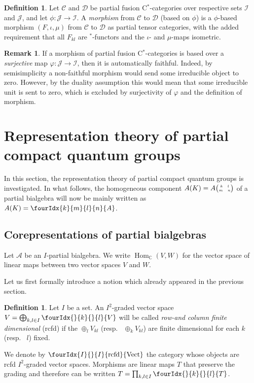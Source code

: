\documentclass[10pt]{article}
\DeclareMathOperator{\Hom}{Hom}
\DeclareMathOperator{\rcf}{\mathrm{rcfd}}
\newcommand{\C}{\mathbb{C}}
\newcommand{\CatCC}{\mathscr{C}}
\newcommand{\CatDD}{\mathscr{D}}
\newcommand{\Vectrcf}{\Gr{\mathrm{Vect}}{I}{I}{}{\rcf}}
\newcommand{\eGr}[5]{#1{{\tiny \begin{pmatrix} #2 \quad #3 \\ #4 \quad #5\end{pmatrix}}}}
\newcommand{\Gr}[5]{\fourIdx{#2}{#4}{#3}{#5}{#1}}%
\newcommand{\Gru}[3]{\Gr{#1}{}{}{#2}{#3}}
\theoremstyle{definition}
\newtheorem{Def}[Theorem]{Definition}
\newtheorem{Rem}[Theorem]{Remark}
\numberwithin{equation}{section}
\begin{document}
\begin{Def} Let $\CatCC$ and $\CatDD$ be partial fusion C$^*$-categories over respective sets $\mathscr{I}$ and $\mathscr{J}$, and let $\phi:\mathscr{J}\rightarrow \mathscr{I}$. 
A \emph{morphism} from $\CatCC$ to $\CatDD$ (based on $\phi$) is a $\phi$-based morphism $(F,\iota,\mu)$ from $\CatCC$ to $\CatDD$ as partial tensor categories, with the added requirement that all $F_{kl}$ are $^*$-functors and the $\iota$- and $\mu$-maps isometric. 
\end{Def} 

\begin{Rem} If a morphism of partial fusion C$^*$-categories is based over a \emph{surjective} map $\varphi: \mathscr{J}\rightarrow \mathscr{I}$, then it is automatically faithful. Indeed, by semisimplicity a non-faithful morphism would send some irreducible object to zero. However, by the duality assumption this would mean that some irreducible unit is sent to zero, which is excluded by surjectivity of $\varphi$ and the definition of morphism.
\end{Rem}


\section{Representation theory of partial compact quantum groups}

In this section, the representation theory of partial compact quantum groups is investigated. In what follows, the homogeneous component $A(K) = \eGr{A}{k}{l}{m}{n}$ of a partial bialgebra will now be mainly written as $A(K) = \Gr{A}{k}{l}{m}{n}$. 

\subsection{Corepresentations of partial bialgebras}


Let $\mathscr{A}$ be an $I$-partial bialgebra. We write
$\Hom_\C(V,W)$ for the vector space of linear maps between two vector
spaces $V$ and $W$.

Let us first formally introduce a notion which already appeared in the previous section.

\begin{Def} Let $I$ be a set. An $I^{2}$-graded vector space $V=\bigoplus_{k,l\in I} \Gru{V}{k}{l}$ will be called \emph{row-and column finite dimensional} (rcfd) if the $\oplus_l V_{kl}$ (resp.~ $\oplus_k V_{kl}$) are finite dimensional for each $k$ (resp.~ $l$) fixed. 

We denote by  $\Vectrcf$ the category whose objects are rcfd $I^{2}$-graded vector spaces. Morphisms are linear maps $T$ that preserve the grading and therefore
can be written $T=\prod_{k,l\in I} \Gru{T}{k}{l}$. 
\end{Def} 
\end{document}
